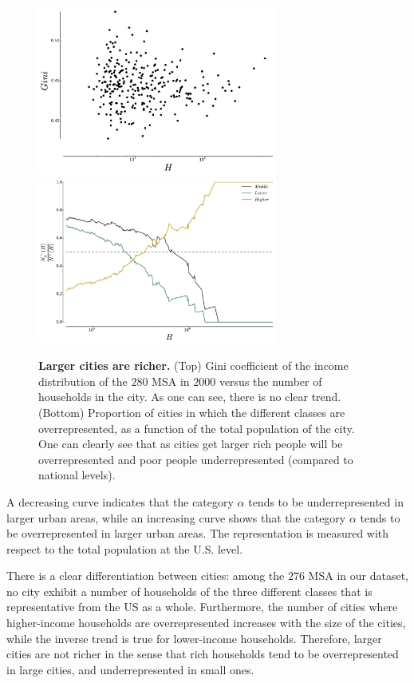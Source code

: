 \begin{figure}[!h]
    \centering
    \includegraphics[width=0.7\textwidth]{./gfx/chapter-segregation/gini_income.pdf}
    \includegraphics[width=0.7\textwidth]{gfx/chapter-segregation/figure3.pdf}
    \caption{{\bf Larger cities are richer.} (Top) Gini coefficient of the income distribution of the $280$ MSA in
    $2000$ versus the number of households in the city. As one can see, there is
    no clear trend. (Bottom) Proportion of cities in which the different classes are
    overrepresented, as a function of the total population of the city. One can
    clearly see that as cities get larger rich people will
    be overrepresented and poor people underrepresented (compared to national
    levels). \label{fig:inter-urban}}
\end{figure}

A decreasing curve indicates that the category $\alpha$ tends to be
underrepresented in larger urban areas, while an increasing curve shows that the
category $\alpha$ tends to be overrepresented in larger urban areas.  The
representation is measured with respect to the total population at the U.S. level.

There is a clear differentiation between cities: among the $276$ MSA in our
dataset, no city exhibit a number of households of the three different classes
that is representative from the US as a whole. Furthermore, the number of cities
where higher-income households are overrepresented increases with the size of
the cities, while the inverse trend is true for lower-income
households. Therefore, larger cities are not richer in the sense that rich
households tend to be overrepresented in large cities, and underrepresented in
small ones.

